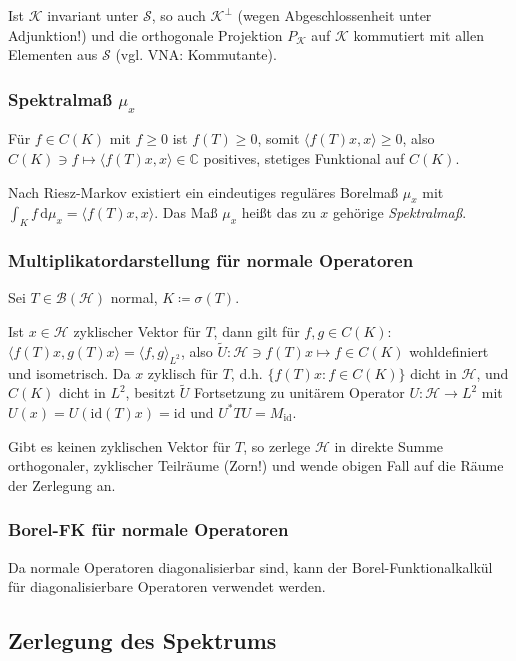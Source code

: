 \documentclass[11pt,a4paper]{scrartcl}
\newcommand{\C}{\mathbb{C}} %
\newcommand{\Hc}{\mathcal{H}}
\newcommand{\Sc}{\mathcal{S}}
\newcommand{\Kc}{\mathcal{K}}
\newcommand{\B}{\mathcal{B}}
\theoremstyle{plain}
\theoremstyle{definition}
\theoremstyle{remark}
\begin{document}
Ist $\Kc$ invariant unter $\Sc$, so auch $\Kc^\bot$ (wegen Abgeschlossenheit unter Adjunktion!) und die orthogonale Projektion $P_\Kc$ auf $\Kc$ kommutiert mit allen Elementen aus $\Sc$ (vgl. VNA: Kommutante).

\subsubsection{Spektralmaß $\mu_x$}

Für $f\in C(K)$ mit $f \geq 0$ ist $f(T) \geq 0$, somit $\langle f(T)x, x \rangle \geq 0$, also $C(K)\ni f \mapsto \langle f(T)x,x \rangle \in \C$ positives, stetiges Funktional auf $C(K)$.

Nach Riesz-Markov existiert ein eindeutiges reguläres Borelmaß $\mu_x$ mit $\int_K f \,\mathrm{d}\mu_x = \langle f(T)x, x \rangle$. Das Maß $\mu_x$ heißt das zu $x$ gehörige \emph{Spektralmaß}.


\subsubsection{Multiplikatordarstellung für normale Operatoren}

Sei $T\in \B(\Hc)$ normal, $K\coloneqq \sigma(T)$. 

Ist $x\in \Hc$ zyklischer Vektor für $T$, dann gilt für $f,g\in C(K)$: $\langle f(T)x, g(T)x \rangle = \langle f,g\rangle_{L^2}$, also $\tilde U: \Hc\ni f(T)x \mapsto f \in C(K)$ wohldefiniert und isometrisch. Da $x$ zyklisch für $T$, d.h. $\{ f(T)x: f\in C(K) \}$ dicht in $\Hc$, und $C(K)$ dicht in $L^2$, besitzt $\tilde U$ Fortsetzung zu unitärem Operator $U: \Hc \to L^2$ mit $U(x)=U(\mathrm{id}(T)x)=\mathrm{id}$ und $U^*TU=M_\mathrm{id}$.

Gibt es keinen zyklischen Vektor für $T$, so zerlege $\Hc$ in direkte Summe orthogonaler, zyklischer Teilräume (Zorn!) und wende obigen Fall auf die Räume der Zerlegung an.

\subsubsection{Borel-FK für normale Operatoren}

Da normale Operatoren diagonalisierbar sind, kann der Borel-Funktionalkalkül für diagonalisierbare Operatoren verwendet werden.

\subsection{Zerlegung des Spektrums}
\end{document}
